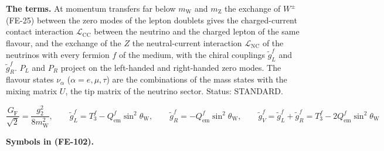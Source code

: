 \documentclass[
  10pt,
]{article}
\begin{document}
\textbf{The terms.} At momentum transfers far below \(m_{\mathrm{W}}\)
and \(m_{\mathrm{Z}}\) the exchange of \(W^\pm\) (FE-25) between the
zero modes of the lepton doublets gives the charged-current contact
interaction \(\mathcal{L}_{\mathrm{CC}}\) between the neutrino and the
charged lepton of the same flavour, and the exchange of the \(Z\) the
neutral-current interaction \(\mathcal{L}_{\mathrm{NC}}\) of the
neutrinos with every fermion \(f\) of the medium, with the chiral
couplings \(\tilde g^f_L\) and \(\tilde g^f_R\). \(P_L\) and \(P_R\)
project on the left-handed and right-handed zero modes. The flavour
states \(\nu_\alpha\) (\(\alpha = e, \mu, \tau\)) are the combinations
of the mass states with the mixing matrix \(U\), the tip matrix of the
neutrino sector. Status: STANDARD.

\[
\frac{G_{\mathrm{F}}}{\sqrt2} = \frac{g_2^2}{8m_{\mathrm{W}}^2},\qquad
\tilde g^f_L = T_3^f - Q_{\mathrm{em}}^f\sin^2\theta_{\mathrm{W}},\qquad \tilde g^f_R =
 -Q_{\mathrm{em}}^f\sin^2\theta_{\mathrm{W}},\qquad
\tilde g^f_V = \tilde g^f_L + \tilde g^f_R = T_3^f - 2Q_{\mathrm{em}}^f\sin^2\theta_{\mathrm{W}} \tag{FE-102}
\]

\textbf{Symbols in (FE-102).}
\end{document}
